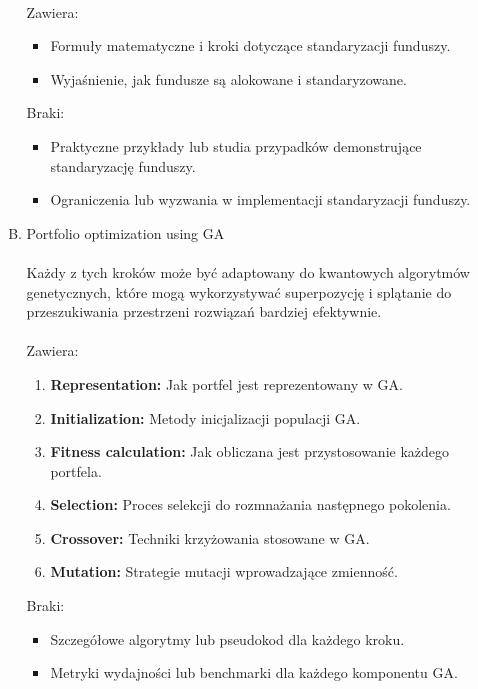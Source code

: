 \documentclass[polish,envcountsect,10pt]{article}
\begin{document}
\begin{enumerate}[I.]
\begin{enumerate}[A.]
                \\
                Zawiera:
                    \begin{itemize}
                      \item Formuły matematyczne i kroki dotyczące standaryzacji funduszy.
                      \item Wyjaśnienie, jak fundusze są alokowane i standaryzowane.
                    \end{itemize}
                Braki:
                    \begin{itemize}
                      \item Praktyczne przykłady lub studia przypadków demonstrujące standaryzację funduszy.
                      \item Ograniczenia lub wyzwania w implementacji standaryzacji funduszy.
                    \end{itemize}
          \item Portfolio optimization using GA
             \\
                \\
                Każdy z tych kroków może być adaptowany do kwantowych algorytmów genetycznych, które mogą wykorzystywać superpozycję i splątanie do przeszukiwania przestrzeni rozwiązań bardziej efektywnie.
                \\
                \\
                Zawiera:
            \begin{enumerate}[1)]
              \item \textbf{Representation:} Jak portfel jest reprezentowany w GA.
              \item \textbf{Initialization:} Metody inicjalizacji populacji GA.
              \item \textbf{Fitness calculation:} Jak obliczana jest przystosowanie każdego portfela.
              \item \textbf{Selection:} Proces selekcji do rozmnażania następnego pokolenia.
              \item \textbf{Crossover:} Techniki krzyżowania stosowane w GA.
              \item \textbf{Mutation:} Strategie mutacji wprowadzające zmienność.
            \end{enumerate}
            Braki:
            \begin{itemize}
              \item Szczegółowe algorytmy lub pseudokod dla każdego kroku.
              \item Metryki wydajności lub benchmarki dla każdego komponentu GA.

\end{itemize}
\end{enumerate}
\end{enumerate}
\end{document}
